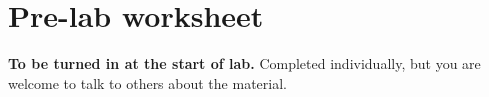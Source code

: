 \documentclass[11pt]{article} %
\begin{document}
%
%
%
%
%

\clearpage
\section*{Pre-lab worksheet}
\label{sec:prelab}

{\bf To be turned in at the start of lab.} Completed individually, but you are welcome to talk to others about the material.
\end{document}
